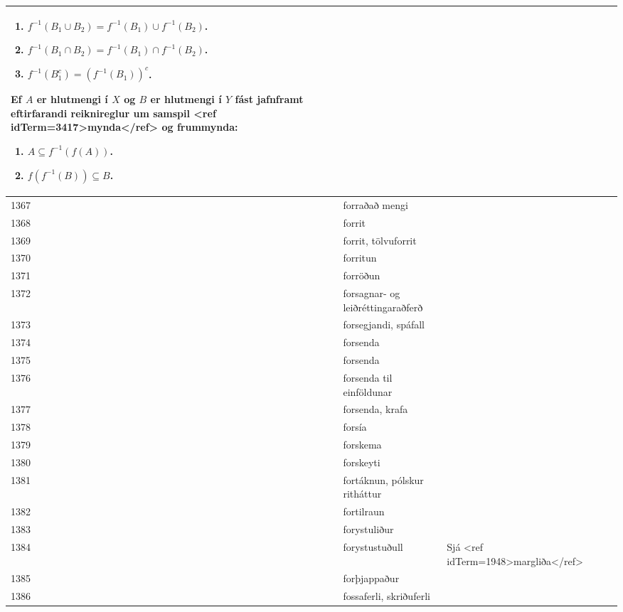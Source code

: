 \begin{longtable}{p{}|p{}|p{}|p{}|p{}}
\begin{enumerate}
    \item $f^{-1}(B_1 \cup B_2) = f^{-1}(B_1) \cup f^{-1}(B_2)$.
    \item $f^{-1}(B_1 \cap B_2) = f^{-1}(B_1) \cap f^{-1}(B_2)$.
    \item $f^{-1}(B_1^c) = (f^{-1}(B_1))^c$.
\end{enumerate}

Ef $A$ er hlutmengi í $X$ og $B$ er hlutmengi í $Y$ fást jafnframt eftirfarandi reiknireglur um samspil <ref idTerm=3417>mynda</ref> og frummynda:

\begin{enumerate}
    \item $A \subseteq f^{-1}(f(A))$.
    \item $f(f^{-1}(B)) \subseteq B$.
\end{enumerate} &  \\
\hline
1367 & forraðað mengi &  &  &  \\
\hline
1368 & forrit &  &  &  \\
\hline
1369 & forrit, tölvuforrit &  &  &  \\
\hline
1370 & forritun &  &  &  \\
\hline
1371 & forröðun &  &  &  \\
\hline
1372 & forsagnar- og leiðréttingaraðferð &  &  &  \\
\hline
1373 & forsegjandi, spáfall &  &  &  \\
\hline
1374 & forsenda &  &  &  \\
\hline
1375 & forsenda &  &  &  \\
\hline
1376 & forsenda til einföldunar &  &  &  \\
\hline
1377 & forsenda, krafa &  &  &  \\
\hline
1378 & forsía &  &  &  \\
\hline
1379 & forskema &  &  &  \\
\hline
1380 & forskeyti &  &  &  \\
\hline
1381 & fortáknun, pólskur ritháttur &  &  &  \\
\hline
1382 & fortilraun &  &  &  \\
\hline
1383 & forystuliður &  &  &  \\
\hline
1384 & forystustuðull & Sjá <ref idTerm=1948>margliða</ref> &  &  \\
\hline
1385 & forþjappaður &  &  &  \\
\hline
1386 & fossaferli, skriðuferli &  &  &  \\

\end{longtable}
